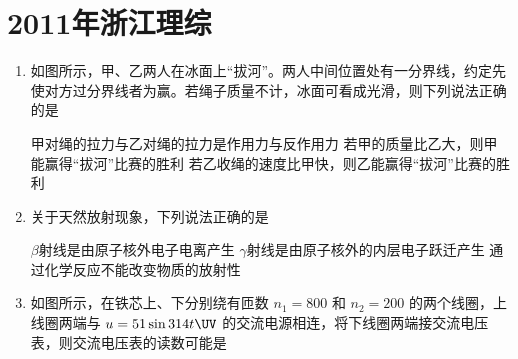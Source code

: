 \documentclass[\gkver]{gaokaozhenti}
\begin{document}
\chapter{2011年浙江理综}

\begin{enumerate}
\item
如图所示，甲、乙两人在冰面上“拔河”。两人中间位置处有一分界线，约定先使对方过分界线者为赢。若绳子质量不计，冰面可看成光滑，则下列说法正确的是


{甲对绳的拉力与乙对绳的拉力是作用力与反作用力}
{若甲的质量比乙大，则甲能赢得“拔河”比赛的胜利}
{若乙收绳的速度比甲快，则乙能赢得“拔河”比赛的胜利}


\item
关于天然放射现象，下列说法正确的是

{$\beta$射线是由原子核外电子电离产生}
{$\gamma$射线是由原子核外的内层电子跃迁产生}
{通过化学反应不能改变物质的放射性}


\item
如图所示，在铁芯上、下分别绕有匝数 $n_{1}=800$ 和 $n_{2}=200$ 的两个线圈，上线圈两端与 $u=51\sin 314t\UV$ 的交流电源相连，将下线圈两端接交流电压表，则交流电压表的读数可能是



\end{enumerate}
\end{document}
